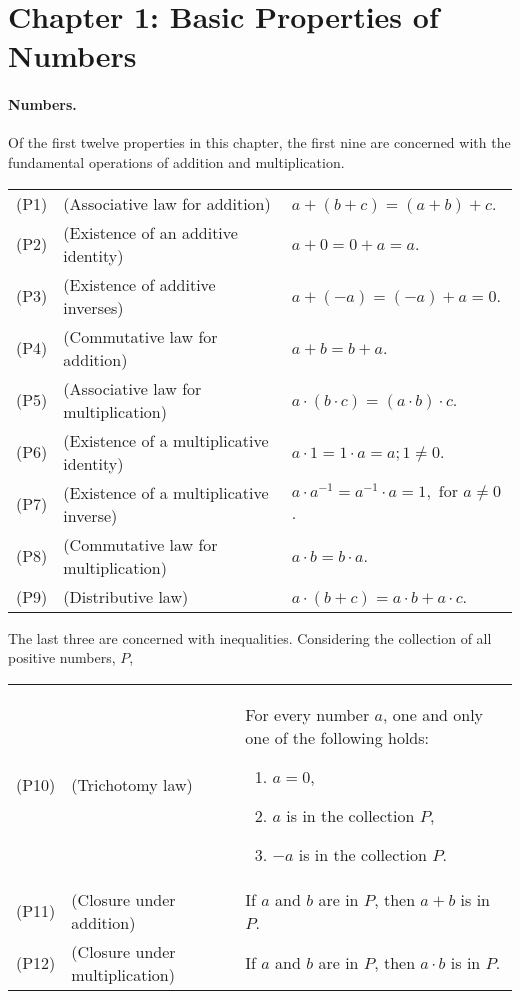 \documentclass{article}
\begin{document}
\section{Chapter 1: Basic Properties of Numbers}

\paragraph{Numbers.} Of the first twelve properties in this chapter, the first nine are concerned with the fundamental operations of addition and multiplication.

\begin{tabular}{l l p{4in}}
  (P1) & (Associative law for addition) & $a + (b + c) = (a + b) + c$. \label{p1} \\
  (P2) & (Existence of an additive identity) & $a + 0 = 0 + a = a$. \label{p2} \\
  (P3) & (Existence of additive inverses) & $a + (-a) = (-a) + a = 0$. \label{p3} \\
  (P4) & (Commutative law for addition) & $a + b = b + a$. \label{p4} \\
  (P5) & (Associative law for multiplication) & $a \cdot (b \cdot c) = (a \cdot b) \cdot c$. \label{p5} \\
  (P6) & (Existence of a multiplicative identity) & $a \cdot 1 = 1 \cdot a = a; 1 \neq 0$. \label{p6} \\
  (P7) & (Existence of a multiplicative inverse) & $a \cdot a^{-1} = a^{-1} \cdot a = 1, \text{ for } a \neq 0$. \label{p7} \\
  (P8) & (Commutative law for multiplication) & $a \cdot b = b \cdot a$. \label{p8} \\
  (P9) & (Distributive law) & $a \cdot (b + c) = a \cdot b + a \cdot c$. \label{p9}
\end{tabular}

The last three are concerned with inequalities. Considering the collection of all positive numbers, $P$,

\begin{tabular}{l l p{4in}}
  (P10) & (Trichotomy law) & For every number $a$, one and only one of the following holds: \begin{enumerate}
      \itemsep0em
      \item $a = 0$,
      \item $a$ is in the collection $P$,
      \item $-a$ is in the collection $P$. \label{p10}
    \end{enumerate} \\
  (P11) & (Closure under addition) & If $a$ and $b$ are in $P$, then $a + b$ is in $P$. \\
  (P12) & (Closure under multiplication) & If $a$ and $b$ are in $P$, then $a \cdot b$ is in $P$.
\end{tabular}
\end{document}
